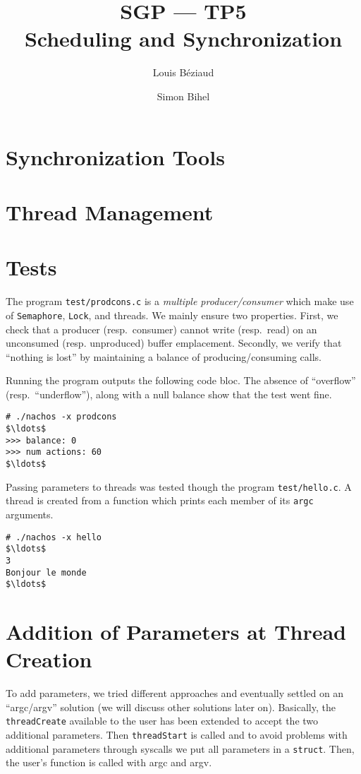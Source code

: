 \documentclass[a4paper,11pt,english]{article}
\title{SGP --- TP5\\Scheduling and Synchronization}
\author{Louis Béziaud \and Simon Bihel}
\begin{document}
\maketitle

\section{Synchronization Tools}


\section{Thread Management}


\section{Tests}
The program \texttt{test/prodcons.c} is a \textit{multiple producer/consumer} which make use of \texttt{Semaphore}, \texttt{Lock}, and threads. We mainly ensure two properties. First, we check that a producer (resp.\ consumer) cannot write (resp.\ read) on an unconsumed (resp. unproduced) buffer emplacement. Secondly, we verify that ``nothing is lost'' by maintaining a balance of producing/consuming calls.

Running the program outputs the following code bloc. The absence of ``overflow'' (resp.\ ``underflow''), along with a null balance show that the test went fine.
\begin{lstlisting}[basicstyle=\ttfamily\small,mathescape]
# ./nachos -x prodcons
$\ldots$
>>> balance: 0
>>> num actions: 60
$\ldots$
\end{lstlisting}

Passing parameters to threads was tested though the program \texttt{test/hello.c}. A thread is created from a function which prints each member of its \texttt{argc} arguments.
\begin{lstlisting}[basicstyle=\ttfamily\small,mathescape]
# ./nachos -x hello
$\ldots$
3
Bonjour le monde 
$\ldots$
\end{lstlisting}



\section{Addition of Parameters at Thread Creation}
To add parameters, we tried different approaches and eventually settled on an
``argc/argv'' solution (we will discuss other solutions later on). Basically,
the \texttt{threadCreate} available to the user has been extended to accept the
two additional parameters. Then \texttt{threadStart} is called and to avoid
problems with additional parameters through syscalls we put all parameters in a
\texttt{struct}. Then, the user's function is called with argc and argv.
\end{document}

